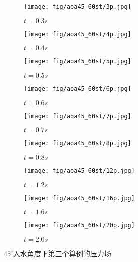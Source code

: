 \begin{figure}[!htp]
  \centering

  \begin{subfigure}{0.25\textwidth}
    \centering
    \texttt{[image: fig/aoa45\_60st/3p.jpg]}
    \caption{$t = 0.3s$}
  \end{subfigure}
  \hspace{1cm}
  \begin{subfigure}{0.25\textwidth}
    \centering
    \texttt{[image: fig/aoa45\_60st/4p.jpg]}
    \caption{$t = 0.4s$}
  \end{subfigure}
  \hspace{1cm}
  \begin{subfigure}{0.25\textwidth}
    \centering
    \texttt{[image: fig/aoa45\_60st/5p.jpg]}
    \caption{$t = 0.5s$}
  \end{subfigure}

  \quad

  \begin{subfigure}{0.25\textwidth}
    \centering
    \texttt{[image: fig/aoa45\_60st/6p.jpg]}
    \caption{$t = 0.6s$}
  \end{subfigure}
  \hspace{1cm}
  \begin{subfigure}{0.25\textwidth}
    \centering
    \texttt{[image: fig/aoa45\_60st/7p.jpg]}
    \caption{$t = 0.7s$}
  \end{subfigure}
  \hspace{1cm}
  \begin{subfigure}{0.25\textwidth}
    \centering
    \texttt{[image: fig/aoa45\_60st/8p.jpg]}
    \caption{$t = 0.8s$}
  \end{subfigure}

  \quad 

  \begin{subfigure}{0.25\textwidth}
    \centering
    \texttt{[image: fig/aoa45\_60st/12p.jpg]}
    \caption{$t = 1.2s$}
  \end{subfigure}
  \hspace{1cm}
  \begin{subfigure}{0.25\textwidth}
    \centering
    \texttt{[image: fig/aoa45\_60st/16p.jpg]}
    \caption{$t = 1.6s$}
  \end{subfigure}
  \hspace{1cm}
  \begin{subfigure}{0.25\textwidth}
    \centering
    \texttt{[image: fig/aoa45\_60st/20p.jpg]}
    \caption{$t = 2.0s$}
  \end{subfigure}

  \caption{$45^\circ$入水角度下第三个算例的压力场}
  \label{fig:detail_45_p}
\end{figure}

